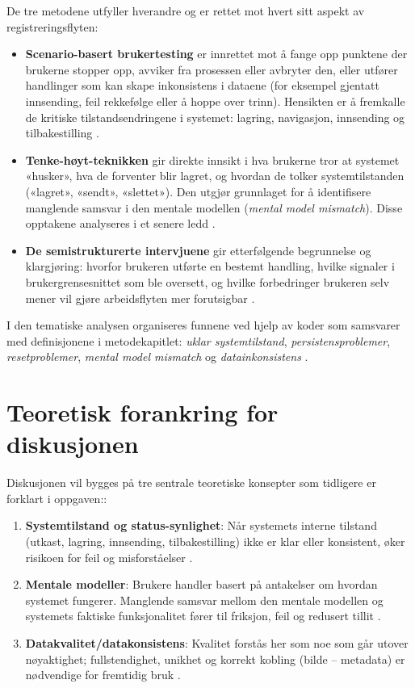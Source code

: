 De tre metodene utfyller hverandre og er rettet mot hvert sitt aspekt av registreringsflyten:
\begin{itemize}
  \item \textbf{Scenario-basert brukertesting} er innrettet mot å fange opp punktene der brukerne stopper opp, avviker fra prosessen eller avbryter den, eller utfører handlinger som kan skape inkonsistens i dataene (for eksempel gjentatt innsending, feil rekkefølge eller å hoppe over trinn). Hensikten er å fremkalle de kritiske tilstandsendringene i systemet: lagring, navigasjon, innsending og tilbakestilling \cite{weichbroth2024}.
  \item \textbf{Tenke-høyt-teknikken} gir direkte innsikt i hva brukerne tror at systemet «husker», hva de forventer blir lagret, og hvordan de tolker systemtilstanden («lagret», «sendt», «slettet»). Den utgjør grunnlaget for å identifisere manglende samsvar i den mentale modellen (\textit{mental model mismatch}). Disse opptakene analyseres i et senere ledd \cite{ericsson1993,norman2013}.
  \item \textbf{De semistrukturerte intervjuene} gir etterfølgende begrunnelse og klargjøring: hvorfor brukeren utførte en bestemt handling, hvilke signaler i brukergrensesnittet som ble oversett, og hvilke forbedringer brukeren selv mener vil gjøre arbeidsflyten mer forutsigbar \cite{weichbroth2024}.
\end{itemize}

I den tematiske analysen organiseres funnene ved hjelp av koder som samsvarer med definisjonene i metodekapitlet: \textit{uklar systemtilstand}, \textit{persistensproblemer}, \textit{resetproblemer}, \textit{mental model mismatch} og \textit{datainkonsistens} \cite{braun2006}.
\newline




\section{Teoretisk forankring for diskusjonen}

Diskusjonen vil bygges på tre sentrale teoretiske konsepter som tidligere er forklart i oppgaven::
\begin{enumerate}
  \item \textbf{Systemtilstand og status-synlighet}: Når systemets interne tilstand (utkast, lagring, innsending, tilbakestilling) ikke er klar eller konsistent, øker risikoen for feil og misforståelser \cite{nielsen1994}.
  \item \textbf{Mentale modeller}: Brukere handler basert på antakelser om hvordan systemet fungerer.
Manglende samsvar mellom den mentale modellen og systemets faktiske funksjonalitet fører til friksjon, feil og redusert tillit \cite{norman2013}.
  \item \textbf{Datakvalitet/datakonsistens}: Kvalitet forstås her som noe som går utover nøyaktighet; fullstendighet, unikhet og korrekt kobling (bilde – metadata) er nødvendige for fremtidig bruk \cite{wang1996}.
\end{enumerate}

